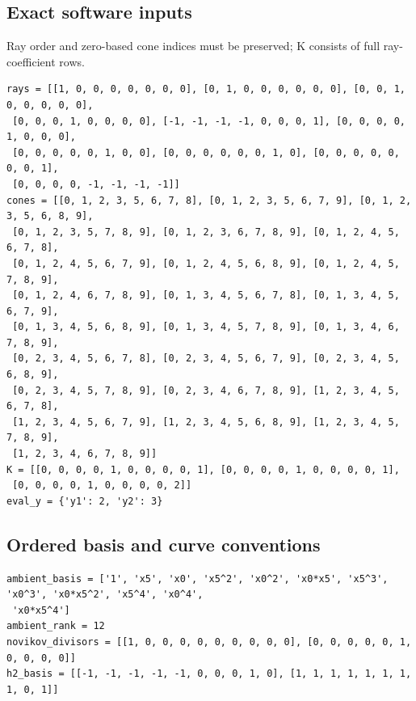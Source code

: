 \documentclass[10pt,a4paper]{article}
\begin{document}
\subsection*{Exact software inputs}
Ray order and zero-based cone indices must be preserved; K consists of full ray-coefficient rows.
\begin{lstlisting}
rays = [[1, 0, 0, 0, 0, 0, 0, 0], [0, 1, 0, 0, 0, 0, 0, 0], [0, 0, 1, 0, 0, 0, 0, 0],
 [0, 0, 0, 1, 0, 0, 0, 0], [-1, -1, -1, -1, 0, 0, 0, 1], [0, 0, 0, 0, 1, 0, 0, 0],
 [0, 0, 0, 0, 0, 1, 0, 0], [0, 0, 0, 0, 0, 0, 1, 0], [0, 0, 0, 0, 0, 0, 0, 1],
 [0, 0, 0, 0, -1, -1, -1, -1]]
cones = [[0, 1, 2, 3, 5, 6, 7, 8], [0, 1, 2, 3, 5, 6, 7, 9], [0, 1, 2, 3, 5, 6, 8, 9],
 [0, 1, 2, 3, 5, 7, 8, 9], [0, 1, 2, 3, 6, 7, 8, 9], [0, 1, 2, 4, 5, 6, 7, 8],
 [0, 1, 2, 4, 5, 6, 7, 9], [0, 1, 2, 4, 5, 6, 8, 9], [0, 1, 2, 4, 5, 7, 8, 9],
 [0, 1, 2, 4, 6, 7, 8, 9], [0, 1, 3, 4, 5, 6, 7, 8], [0, 1, 3, 4, 5, 6, 7, 9],
 [0, 1, 3, 4, 5, 6, 8, 9], [0, 1, 3, 4, 5, 7, 8, 9], [0, 1, 3, 4, 6, 7, 8, 9],
 [0, 2, 3, 4, 5, 6, 7, 8], [0, 2, 3, 4, 5, 6, 7, 9], [0, 2, 3, 4, 5, 6, 8, 9],
 [0, 2, 3, 4, 5, 7, 8, 9], [0, 2, 3, 4, 6, 7, 8, 9], [1, 2, 3, 4, 5, 6, 7, 8],
 [1, 2, 3, 4, 5, 6, 7, 9], [1, 2, 3, 4, 5, 6, 8, 9], [1, 2, 3, 4, 5, 7, 8, 9],
 [1, 2, 3, 4, 6, 7, 8, 9]]
K = [[0, 0, 0, 0, 1, 0, 0, 0, 0, 1], [0, 0, 0, 0, 1, 0, 0, 0, 0, 1],
 [0, 0, 0, 0, 1, 0, 0, 0, 0, 2]]
eval_y = {'y1': 2, 'y2': 3}
\end{lstlisting}
\subsection*{Ordered basis and curve conventions}
\begin{lstlisting}
ambient_basis = ['1', 'x5', 'x0', 'x5^2', 'x0^2', 'x0*x5', 'x5^3', 'x0^3', 'x0*x5^2', 'x5^4', 'x0^4',
 'x0*x5^4']
ambient_rank = 12
novikov_divisors = [[1, 0, 0, 0, 0, 0, 0, 0, 0, 0], [0, 0, 0, 0, 0, 1, 0, 0, 0, 0]]
h2_basis = [[-1, -1, -1, -1, -1, 0, 0, 0, 1, 0], [1, 1, 1, 1, 1, 1, 1, 1, 0, 1]]
\end{lstlisting}
\end{document}
